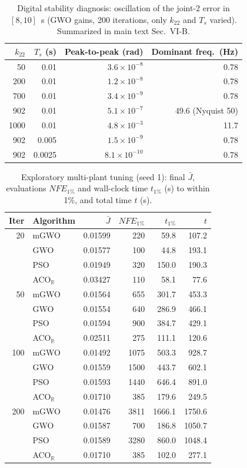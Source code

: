 \documentclass[10pt,journal,compsoc]{IEEEtran}
\newcommand{\mgwo}{mGWO}
\newcommand{\acor}{ACO$_\mathbb{R}$}
\begin{document}
\begin{table}[h]
\centering\footnotesize
\caption{Digital stability diagnosis: oscillation of the joint-2 error in $[8,10]$~s (GWO gains, 200 iterations, only $k_{22}$ and $T_s$ varied). Summarized in main text Sec.~VI-B.}
\label{tab:s_chatter}
\begin{tabular}{rrrr}
\toprule
$k_{22}$ & $T_s$ (s) & Peak-to-peak (rad) & Dominant freq.\ (Hz)\\
\midrule
50 & 0.01 & $3.6\times10^{-8}$ & 0.78\\
200 & 0.01 & $1.2\times10^{-8}$ & 0.78\\
700 & 0.01 & $3.4\times10^{-9}$ & 0.78\\
902 & 0.01 & $5.1\times10^{-7}$ & 49.6 (Nyquist 50)\\
1000 & 0.01 & $4.8\times10^{-3}$ & 11.7\\
902 & 0.005 & $1.5\times10^{-9}$ & 0.78\\
902 & 0.0025 & $8.1\times10^{-10}$ & 0.78\\
\bottomrule
\end{tabular}
\end{table}

\begin{table}[h]
\centering\footnotesize
\caption{Exploratory multi-plant tuning (seed 1): final $\bar J$, evaluations $NFE_{1\%}$ and wall-clock time $t_{1\%}$ (s) to within 1\%, and total time $t$ (s).}
\label{tab:s_multi}
\begin{tabular}{rl rrrr}
\toprule
Iter & Algorithm & $\bar J$ & $NFE_{1\%}$ & $t_{1\%}$ & $t$\\
\midrule
20  & \mgwo{} & 0.01599 & 220 & 59.8 & 107.2\\
    & GWO     & 0.01577 & 100 & 44.8 & 193.1\\
    & PSO     & 0.01949 & 320 & 150.0 & 190.3\\
    & \acor{} & 0.03427 & 110 & 58.1 & 77.6\\
\midrule
50  & \mgwo{} & 0.01564 & 655 & 301.7 & 453.3\\
    & GWO     & 0.01554 & 640 & 286.9 & 466.1\\
    & PSO     & 0.01594 & 900 & 384.7 & 429.1\\
    & \acor{} & 0.02511 & 275 & 111.1 & 120.6\\
\midrule
100 & \mgwo{} & 0.01492 & 1075 & 503.3 & 928.7\\
    & GWO     & 0.01559 & 1500 & 443.7 & 602.1\\
    & PSO     & 0.01593 & 1440 & 646.4 & 891.0\\
    & \acor{} & 0.01710 & 385 & 179.6 & 249.5\\
\midrule
200 & \mgwo{} & 0.01476 & 3811 & 1666.1 & 1750.6\\
    & GWO     & 0.01587 & 700 & 186.8 & 1050.7\\
    & PSO     & 0.01589 & 3280 & 860.0 & 1048.4\\
    & \acor{} & 0.01710 & 385 & 102.0 & 277.1\\
\bottomrule
\end{tabular}
\end{table}
\end{document}
